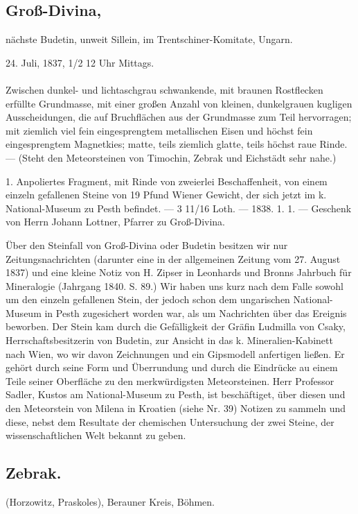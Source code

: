 \documentclass[a4paper, 11pt, oneside, polutonikogreek, german]{article}
\begin{document}
\subsection[Groß-Divina.]{Groß-Divina,}
\begin{center}
\small
nächste Budetin, unweit Sillein, im Trentschiner-Komitate, Ungarn.

24. Juli, 1837, 1/2 12 Uhr Mittags.
\end{center}
\paragraph{}
Zwischen dunkel- und lichtaschgrau schwankende, mit braunen Rostflecken erfüllte Grundmasse, mit einer großen Anzahl von kleinen, dunkelgrauen kugligen Ausscheidungen, die auf Bruchflächen aus der Grundmasse zum Teil hervorragen; mit ziemlich viel fein eingesprengtem metallischen Eisen und höchst fein eingesprengtem Magnetkies; matte, teils ziemlich glatte, teils höchst raue Rinde. — (Steht den Meteorsteinen von Timochin, Zebrak und Eichstädt sehr nahe.)

1. Anpoliertes Fragment, mit Rinde von zweierlei Beschaffenheit, von einem einzeln gefallenen Steine von 19 Pfund Wiener Gewicht, der sich jetzt im k. National-Museum zu Pesth befindet. — 3 11/16 Loth. — 1838. 1. 1. — Geschenk von Herrn Johann Lottner, Pfarrer zu Groß-Divina.

Über den Steinfall von Groß-Divina oder Budetin besitzen wir nur Zeitungsnachrichten (darunter eine in der allgemeinen Zeitung vom 27. August 1837) und eine kleine Notiz von H. Zipser in Leonhards und Bronns Jahrbuch für Mineralogie (Jahrgang 1840. S. 89.) Wir haben uns kurz nach dem Falle sowohl um den einzeln gefallenen Stein, der jedoch schon dem ungarischen National-Museum in Pesth zugesichert worden war, als um Nachrichten über das Ereignis beworben. Der Stein kam durch die Gefälligkeit der Gräfin Ludmilla von Csaky, Herrschaftsbesitzerin von Budetin, zur Ansicht in das k. Mineralien-Kabinett nach Wien, wo wir davon Zeichnungen und ein Gipsmodell anfertigen ließen. Er gehört durch seine Form und Überrundung und durch die Eindrücke au einem Teile seiner Oberfläche zu den merkwürdigsten Meteorsteinen. Herr Professor Sadler, Kustos am National-Museum zu Pesth, ist beschäftiget, über diesen und den Meteorstein von Milena in Kroatien (siehe Nr. 39) Notizen zu sammeln und diese, nebst dem Resultate der chemischen Untersuchung der zwei Steine, der wissenschaftlichen Welt bekannt zu geben.
\subsection{Zebrak.}
\begin{center}
\small
(Horzowitz, Praskoles), Berauner Kreis, Böhmen.
\end{center}
\end{document}
